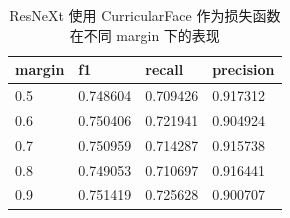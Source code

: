 \documentclass[12pt]{article}
\begin{document}

\begin{table}[htbp]
  \centering
  \caption{ResNeXt 使用 CurricularFace 作为损失函数在不同 margin 下的表现}
  \label{tab:resnext_hp_curface}
  \begin{tabular}{llll}
    \toprule
    margin & f1       & recall   & precision \\
    \midrule
    0.5 & 0.748604 & 0.709426 & 0.917312  \\
    0.6 & 0.750406 & 0.721941 & 0.904924  \\
    0.7 & 0.750959 & 0.714287 & 0.915738  \\
    0.8 & 0.749053 & 0.710697 & 0.916441  \\
    0.9 & 0.751419 & 0.725628 & 0.900707 \\
    \bottomrule
  \end{tabular}
\end{table}
\end{document}
